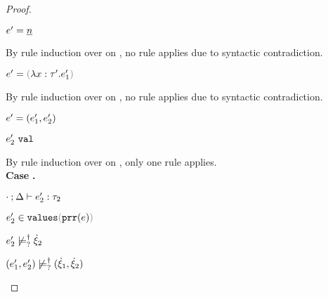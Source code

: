 \begin{proof}
\begin{byCases}
\begin{byCases}
\begin{byCases}
\begin{byCases}
\begin{byCases}
            \begin{byCases}
              \item[\text{(\ref{rule:VNum})}]
              \begin{pfsteps*}
              \item $e'=\underline{n}$ 
              \end{pfsteps*} 
              By rule induction over  on , no rule applies due to syntactic contradiction.
              \item[\text{(\ref{rule:VLam})}]
              \begin{pfsteps*} 
              \item $e'=\hlam{x}{\tau'}{e_1'}$ 
              \end{pfsteps*}
              By rule induction over  on , no rule applies due to syntactic contradiction.
              \item[\text{(\ref{rule:VPair})}] 
              \begin{pfsteps*} 
              \item $e'=(e_1' , e_2')$ 
              \item $e_2' ~\mathtt{val}$  
              \end{pfsteps*}
              By rule induction over  on , only one rule applies. \\
                \textbf{Case} \text{(\ref{rule:TPair})}\textbf{.}
                \begin{pfsteps*}
                \item $\cdot \mathbin{;} \Delta \vdash e_2' : \tau_2$  
                \item $\inValues{e_2'}{\hprr{e}}$  
                \item $e_2' \not\models_{?}^{\dag} \dot{\xi}_2$  
                \item $(e_1' , e_2') \not\models_{?}^{\dag} (\dot{\xi}_1 , \dot{\xi}_2)$ 
                \end{pfsteps*}

\end{byCases}
\end{byCases}
\end{byCases}
\end{byCases}
\end{byCases}
\end{byCases}
\end{proof}
